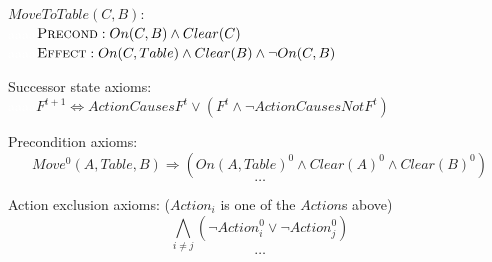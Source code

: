 \documentclass{article}
\begin{document}
\begin{enumerate}
$MoveToTable(C,B):$ \\
\textcolor{white}{aaaa}$\textsc{Precond}:On(C,B) \land Clear(C)$ \\
\textcolor{white}{aaaa}$\textsc{Effect}:On(C,Table) \land Clear(B) \land \neg On(C,B)$

Successor state axioms: \\
\textcolor{white}{aaaa}$F^{t+1} \Leftrightarrow ActionCausesF^t \lor (F^t \land \neg ActionCausesNotF^t)$

Precondition axioms: \\
$$Move^0(A,Table,B) \Rightarrow (On(A,Table)^0 \land Clear(A)^0 \land Clear(B)^0)$$ 
$$\dots$$

Action exclusion axioms: ($Action_i$ is one of the $Action$s above)\\
$$\bigwedge_{i\neq j} (\neg Action_i^0 \lor \neg Action_j^0)$$ 
$$\dots$$

\end{enumerate}
\end{document}

